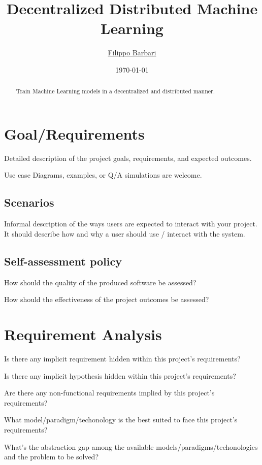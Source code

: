 \documentclass[12pt,a4paper,oneside,article]{article}
\title{Decentralized Distributed Machine Learning}
\author{\href{mailto:filippo.barbari@studio.unibo.it}{Filippo Barbari}}
\date{\today}
\begin{document}
	\maketitle
	
	\begin{abstract}
		Train Machine Learning models in a decentralized and distributed manner.
	\end{abstract}
	\clearpage
	
	\tableofcontents
	\clearpage
	
	\section{Goal/Requirements}
		Detailed description of the project goals, requirements, and expected outcomes.
		
		Use case Diagrams, examples, or Q/A simulations are welcome.
		
		\subsection{Scenarios}
			Informal description of the ways users are expected to interact with your project. It should describe how and why a user should use / interact with the system.
			
		\subsection{Self-assessment policy}
			How should the quality of the produced software be assessed?
			
			How should the effectiveness of the project outcomes be assessed?
	
	\section{Requirement Analysis}
		Is there any implicit requirement hidden within this project's requirements?
		
		Is there any implicit hypothesis hidden within this project's requirements?
		
		Are there any non-functional requirements implied by this project's requirements?
		
		What model/paradigm/techonology is the best suited to face this project's requirements?
		
		What's the abstraction gap among the available models/paradigms/techonologies and the problem to be solved?
	
\end{document}
